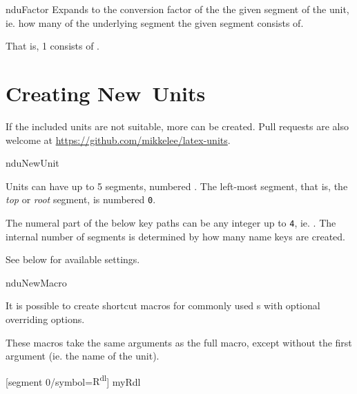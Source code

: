 \documentclass{article}
\begin{document}
\begin{docCommand}
	{nduFactor}
	{}
	Expands to the conversion factor of the the given segment of the unit, ie. how many of the underlying segment the given segment consists of.

\begin{dispExample}
That is, 1  consists of
 .
\end{dispExample}
\end{docCommand}

\clearpage
\section{Creating New Units} %

\label{units:new}
If the included units are not suitable, more can be created. Pull requests are also welcome at \url{https://github.com/mikkelee/latex-units}.

\begin{docCommand}
	{nduNewUnit}
	{}
	
Units can have up to 5 segments, numbered . The left-most segment, that is, the \emph{top} or \emph{root} segment, is numbered \texttt{0}.

The numeral part of the below key paths  can be any integer up to \texttt{4}, ie. . The internal number of segments is determined by how many name keys are created.

See below for available settings.

\end{docCommand}

\begin{docCommand}
	{nduNewMacro}
	{}

	It is possible to create shortcut macros for commonly used s with optional overriding options.

	These macros take the same arguments as the full  macro, except without the first argument (ie. the name of the unit).

\begin{dispExample}
	[segment 0/symbol={R\textsuperscript{dl}}]
	{myRdl}
\end{dispExample}

\end{docCommand}
\end{document}

